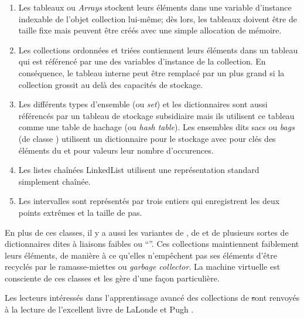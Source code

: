 \documentclass[a4paper,10pt,twoside]{book}
\begin{document}
\begin{enumerate}
  \item Les tableaux ou \emph{Arrays} stockent leurs éléments dans une
variable d'instance indexable de l'objet collection lui-même; 
dès lors, les tableaux doivent être de taille fixe mais peuvent être
créés avec une simple allocation de mémoire.
  \item Les collections ordonnées  et triées 
 contiennent leurs éléments dans un tableau
qui est référencé par une des variables d'instance de la collection.
En conséquence, le tableau interne peut être remplacé par un 
plus grand si la collection grossit au delà des capacités de 
stockage.
  \item Les différents types d'ensemble (ou \emph{set}) et les dictionnaires
sont aussi référencés par un tableau de stockage subsidiaire
mais ils utilisent ce tableau comme une table de hachage (ou \emph{hash table}). Les ensembles dits sacs ou \emph{bags} (de classe ) utilisent
un dictionnaire  pour le stockage avec pour clés
des éléments du  et pour valeurs leur nombre d'occurences.
  \item Les listes chaînées LinkedList utilisent une
représentation standard simplement chaînée.
  \item Les intervalles  sont représentés 
par trois entiers qui enregistrent les deux points extrêmes et la taille de pas.
\end{enumerate}
En plus de ces classes, il y a aussi les variantes de \mbox{,} de  et de plusieurs sortes de dictionnaires dites à liaisons faibles ou ``''. Ces collections maintiennent faiblement leurs éléments, \ie de manière à ce qu'elles n'empêchent pas ses éléments d'être
recyclés par le ramasse-miettes ou \emph{garbage collector}.
La machine virtuelle \pharo est consciente de ces classes et les gère d'une façon particulière.

Les lecteurs intéressés dans l'apprentissage avancé des collections
de \st sont renvoyés à la lecture de l'excellent livre de LaLonde et Pugh
\cite{LaLo90a}.

\end{document}
